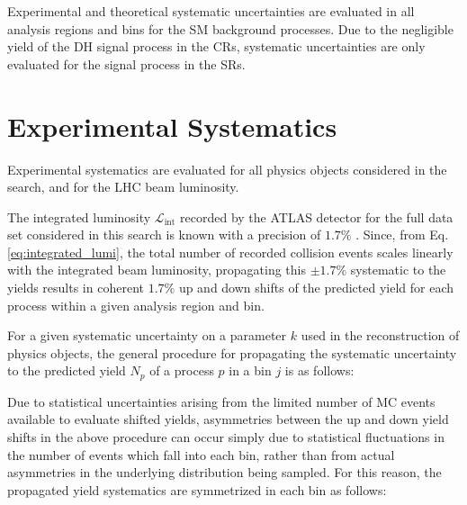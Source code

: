 Experimental and theoretical systematic uncertainties are evaluated in all analysis regions and bins for the SM background processes. Due to the negligible yield of the DH signal process in the CRs, systematic uncertainties are only evaluated for the signal process in the SRs.

\section{Experimental Systematics}

Experimental systematics are evaluated for all physics objects considered in the search, and for the LHC beam luminosity. 

The integrated luminosity \(\mathcal{L}_\text{int}\) recorded by the ATLAS detector for the full data set considered in this search is known with a precision of \(1.7\%\) \cite{ATLAS-CONF-2019-021}. Since, from Eq. \ref{eq:integrated_lumi}, the total number of recorded collision events scales linearly with the integrated beam luminosity, propagating this \(\pm1.7\%\) systematic to the yields results in coherent \(1.7\%\) up and down shifts of the predicted yield for each process within a given analysis region and bin.

For a given systematic uncertainty on a parameter \(k\) used in the reconstruction of physics objects, the general procedure for propagating the systematic uncertainty to the predicted yield \(N_p\) of a process \(p\) in a bin \(j\) is as follows:


\noindent Due to statistical uncertainties arising from the limited number of MC events available to evaluate shifted yields, asymmetries between the up and down yield shifts in the above procedure can occur simply due to statistical fluctuations in the number of events which fall into each bin, rather than from actual asymmetries in the underlying distribution being sampled. For this reason, the propagated yield systematics are symmetrized in each bin as follows:


